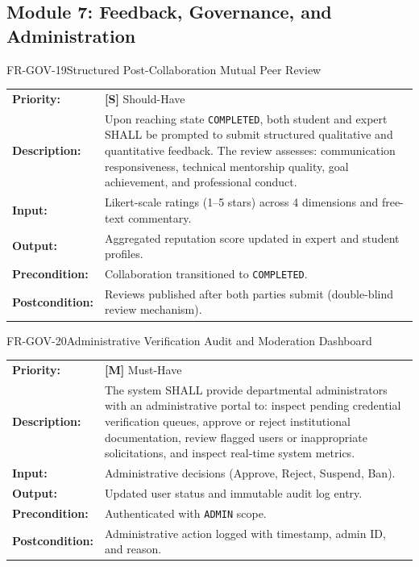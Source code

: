 \documentclass[11pt,a4paper]{article}
\begin{document}
\subsection{Module 7: Feedback, Governance, and Administration}

\begin{reqbox}{FR-GOV-19}{Structured Post-Collaboration Mutual Peer Review}
\begin{tabularx}{\textwidth}{@{}lX@{}}
\textbf{Priority:} & \textbf{[S]} Should-Have \\
\textbf{Description:} & Upon reaching state \texttt{COMPLETED}, both student and expert SHALL be prompted to submit structured qualitative and quantitative feedback. The review assesses: communication responsiveness, technical mentorship quality, goal achievement, and professional conduct. \\
\textbf{Input:} & Likert-scale ratings (1--5 stars) across 4 dimensions and free-text commentary. \\
\textbf{Output:} & Aggregated reputation score updated in expert and student profiles. \\
\textbf{Precondition:} & Collaboration transitioned to \texttt{COMPLETED}. \\
\textbf{Postcondition:} & Reviews published after both parties submit (double-blind review mechanism). \\
\end{tabularx}
\end{reqbox}

\begin{reqbox}{FR-GOV-20}{Administrative Verification Audit and Moderation Dashboard}
\begin{tabularx}{\textwidth}{@{}lX@{}}
\textbf{Priority:} & \textbf{[M]} Must-Have \\
\textbf{Description:} & The system SHALL provide departmental administrators with an administrative portal to: inspect pending credential verification queues, approve or reject institutional documentation, review flagged users or inappropriate solicitations, and inspect real-time system metrics. \\
\textbf{Input:} & Administrative decisions (Approve, Reject, Suspend, Ban). \\
\textbf{Output:} & Updated user status and immutable audit log entry. \\
\textbf{Precondition:} & Authenticated with \texttt{ADMIN} scope. \\
\textbf{Postcondition:} & Administrative action logged with timestamp, admin ID, and reason. \\
\end{tabularx}
\end{reqbox}
\end{document}
